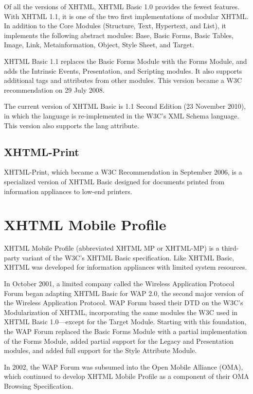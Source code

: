 Of all the versions of XHTML, XHTML Basic 1.0 provides the fewest features. With XHTML 1.1, it is one of the two first implementations of modular XHTML. In addition to the Core Modules (Structure, Text, Hypertext, and List), it implements the following abstract modules: Base, Basic Forms, Basic Tables, Image, Link, Metainformation, Object, Style Sheet, and Target.

XHTML Basic 1.1 replaces the Basic Forms Module with the Forms Module, and adds the Intrinsic Events, Presentation, and Scripting modules. It also supports additional tags and attributes from other modules. This version became a W3C recommendation on 29 July 2008.

The current version of XHTML Basic is 1.1 Second Edition (23 November 2010), in which the language is re-implemented in the W3C's XML Schema language. This version also supports the lang attribute.



\subsection{XHTML-Print}


XHTML-Print, which became a W3C Recommendation in September 2006, is a specialized version of XHTML Basic designed for documents printed from information appliances to low-end printers.

\section{XHTML Mobile Profile}


XHTML Mobile Profile (abbreviated XHTML MP or XHTML-MP) is a third-party variant of the W3C's XHTML Basic specification. Like XHTML Basic, XHTML was developed for information appliances with limited system resources.

In October 2001, a limited company called the Wireless Application Protocol Forum began adapting XHTML Basic for WAP 2.0, the second major version of the Wireless Application Protocol. WAP Forum based their DTD on the W3C's Modularization of XHTML, incorporating the same modules the W3C used in XHTML Basic 1.0—except for the Target Module. Starting with this foundation, the WAP Forum replaced the Basic Forms Module with a partial implementation of the Forms Module, added partial support for the Legacy and Presentation modules, and added full support for the Style Attribute Module.

In 2002, the WAP Forum was subsumed into the Open Mobile Alliance (OMA), which continued to develop XHTML Mobile Profile as a component of their OMA Browsing Specification.


